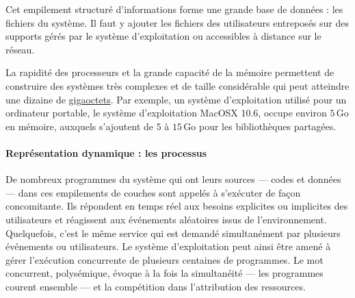 Cet empilement structuré d’informations forme une grande base de données : les fichiers du système. Il faut y ajouter les fichiers des utilisateurs entreposés sur des supports gérés par le système d’exploitation ou accessibles à distance sur le réseau.

La rapidité des processeurs et la grande capacité de la mémoire permettent de construire des systèmes très complexes et de taille considérable qui peut atteindre une dizaine de \href{https://interstices.info/jcms/c_19937/octet}{gigaoctets}. Par exemple, un système d’exploitation utilisé pour un ordinateur portable, le système d’exploitation MacOSX 10.6, occupe environ $5$\,Go en mémoire, auxquels s’ajoutent de $5$ à $15$\,Go pour les bibliothèques partagées.

\paragraph*{Représentation dynamique : les processus}

De nombreux programmes du système qui ont leurs sources --- codes et données --- dans ces empilements de couches sont appelés à s’exécuter de façon concomitante. Ils répondent en temps réel aux besoins explicites ou implicites des utilisateurs et réagissent aux événements aléatoires issus de l’environnement. Quelquefois, c’est le même service qui est demandé simultanément par plusieurs événements ou utilisateurs. Le système d’exploitation peut ainsi être amené à gérer l’exécution concurrente de plusieurs centaines de programmes. Le mot concurrent, polysémique, évoque à la fois la simultanéité --- les programmes courent ensemble --- et la compétition dans l’attribution des ressources.

